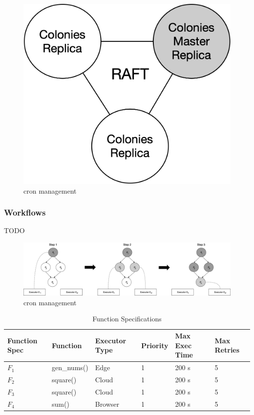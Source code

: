 \documentclass{article}
\begin{document}
\begin{figure}[h]
	\centering
    \includegraphics[scale=0.4]{raft.png}
	\caption{cron management}
	\label{fig:fig1}
\end{figure}

\subsubsection{Workflows}
TODO
\begin{figure}[h]
	\centering
    \includegraphics[scale=0.32]{workflow.png}
	\caption{cron management}
	\label{fig:fig1}
\end{figure}

\begin{table}[h]
	\caption{Function Specifications}
	\centering
	\begin{tabular}{llllll}
		\toprule
		\cmidrule(r){1-2}
        Function Spec & Function        & Executor Type & Priority & Max Exec Time & Max Retries \\
		\midrule
        $F_{1}$       & gen\_nums()     & Edge          & 1        & 200 s         & 5 \\
        $F_{2}$       & square()        & Cloud         & 1        & 200 s         & 5 \\
        $F_{3}$       & square()        & Cloud         & 1        & 200 s         & 5 \\
        $F_{4}$       & sum()           & Browser       & 1        & 200 s         & 5 \\
		\bottomrule
	\end{tabular}
	\label{tab:table}
\end{table}
\end{document}
